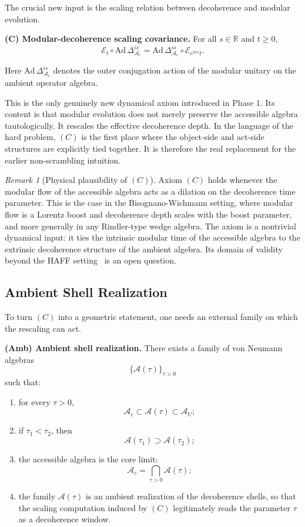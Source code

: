 \documentclass[12pt]{article}
\theoremstyle{definition}
\theoremstyle{remark}
\newtheorem{remark}[theorem]{Remark}
\newcommand{\tightlist}{%
  \setlength{\itemsep}{0pt}\setlength{\parskip}{0pt}}
\begin{document}
The crucial new input is the scaling relation between decoherence and
modular evolution.

\textbf{(C) Modular-decoherence scaling covariance.}
For all \(s\in\mathbb{R}\) and \(t\ge 0\), \[
\mathcal{E}_t\circ \mathrm{Ad}\,\Delta_{\mathcal{A}_c}^{is}
=
\mathrm{Ad}\,\Delta_{\mathcal{A}_c}^{is}\circ \mathcal{E}_{e^{2\pi s}t}.
\]

Here \(\mathrm{Ad}\,\Delta_{\mathcal{A}_c}^{is}\) denotes the outer
conjugation action of the modular unitary on the ambient operator
algebra.

This is the only genuinely new dynamical axiom introduced in Phase 1.
Its content is that modular evolution does not merely preserve the
accessible algebra tautologically. It rescales the effective decoherence
depth. In the language of the hard problem, \((C)\) is the first place
where the object-side and act-side structures are explicitly tied
together. It is therefore the real replacement for the earlier
non-scrambling intuition.

\begin{remark}[Physical plausibility of \((C)\)]
Axiom \((C)\) holds whenever the modular flow of the accessible algebra
acts as a dilation on the decoherence time parameter. This is the case
in the Bisognano-Wichmann setting, where modular flow is a Lorentz
boost and decoherence depth scales with the boost parameter, and more
generally in any Rindler-type wedge algebra. The axiom is a nontrivial
dynamical input: it ties the intrinsic modular time of the accessible
algebra to the extrinsic decoherence structure of the ambient algebra.
Its domain of validity beyond the HAFF setting~\cite{Liu2026PaperD} is
an open question.
\end{remark}

\subsection{Ambient Shell Realization}\label{ambient-shell-realization}

To turn \((C)\) into a geometric statement, one needs an external family
on which the rescaling can act.

\textbf{(Amb) Ambient shell realization.}
There exists a family of von Neumann algebras \[
\{\mathcal{A}(\tau)\}_{\tau>0}
\] such that:

\begin{enumerate}
\def\labelenumi{\arabic{enumi}.}
\tightlist
\item
  for every \(\tau>0\), \[
  \mathcal{A}_c\subset \mathcal{A}(\tau)\subset \mathcal{A}_U;
  \]
\item
  if \(\tau_1<\tau_2\), then \[
  \mathcal{A}(\tau_1)\supset \mathcal{A}(\tau_2);
  \]
\item
  the accessible algebra is the core limit: \[
  \mathcal{A}_c=\bigcap_{\tau>0}\mathcal{A}(\tau);
  \]
\item
  the family \(\mathcal{A}(\tau)\) is an ambient realization of the
  decoherence shells, so that the scaling computation induced by \((C)\)
  legitimately reads the parameter \(\tau\) as a decoherence window.
\end{enumerate}
\end{document}
